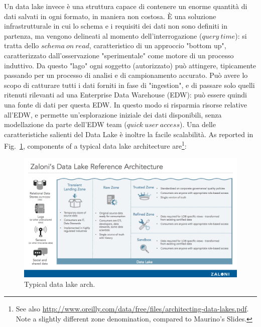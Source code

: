 \documentclass[a4page, 11pt]{article}
\begin{document}
Un data lake invece è una struttura capace di contenere un enorme quantità di dati salvati in ogni formato, in maniera non costosa.
\`E una soluzione infrastrutturale in cui lo schema e i requisiti dei dati non sono definiti in partenza, ma vengono delineati al momento dell'interrogazione ($query\ time$): si tratta dello $schema\ on\ read$, caratteristico di un approccio "bottom up", caratterizzato dall'osservazione "sperimentale" come motore di un processo induttivo. 
Da questo "lago" ogni soggetto (autorizzato) può attingere, tipicamente passando per un processo di analisi e di campionamento accurato. 
Può avere lo scopo di catturare tutti i dati forniti in fase di "ingestion", e di passare solo quelli ritenuti rilevanti ad una Enterprise Data Warehouse (EDW): può essere quindi una fonte di dati per questa EDW. In questo modo si risparmia risorse relative all'EDW, e permette un'esplorazione iniziale dei dati disponibili, senza modellazione da parte dell'EDW team ($quick\ user \ access$).
Una delle caratteristiche salienti del Data Lake è inoltre la facile scalabilità. 
As reported in Fig.~\ref{data_lake_arch:fig}, components of a typical data lake architecture are\footnote{See also \url{http://www.oreilly.com/data/free/files/architecting-data-lakes.pdf}. Note a slightly different zone denomination, compared to Maurino's Slides.}:

\begin{figure}
\centering
\includegraphics[width=120mm]{data_lake_arch.png}
\caption{\label{data_lake_arch:fig} Typical data lake arch.
}
\end{figure}
\end{document}
